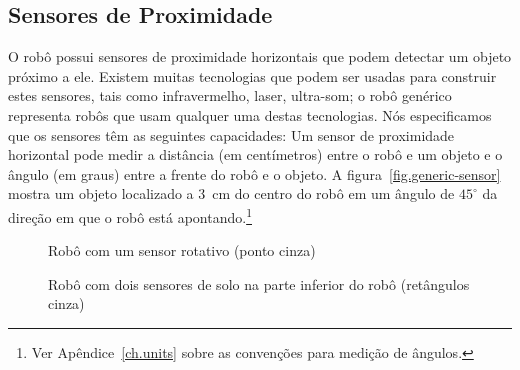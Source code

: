 \subsection{Sensores de Proximidade}

O robô possui sensores de proximidade horizontais que podem detectar um objeto próximo a ele. Existem muitas tecnologias que podem ser usadas para construir estes sensores, tais como infravermelho, laser, ultra-som; o robô genérico representa robôs que usam qualquer uma destas tecnologias. Nós especificamos que os sensores têm as seguintes capacidades: Um sensor de proximidade horizontal pode medir a distância (em centímetros) entre o robô e um objeto e o ângulo (em graus) entre a frente do robô e o objeto. A figura~\ref{fig.generic-sensor} mostra um objeto localizado a $3\,$ cm do centro do robô em um ângulo de $45^{\circ}$ da direção em que o robô está apontando.\footnote{Ver Apêndice~\ref{ch.units} sobre as convenções para medição de ângulos.}

\begin{figure}
\begin{minipage}{.45\textwidth}
\caption{Robô com um sensor rotativo (ponto cinza)}
\label{fig.generic-sensor}
\end{minipage}
\hspace{\fill}
\begin{minipage}{.45\textwidth}
\caption{Robô com dois sensores de solo na parte inferior do robô (retângulos cinza)}
\label{fig.generic-ground}
\end{minipage}
\end{figure}


